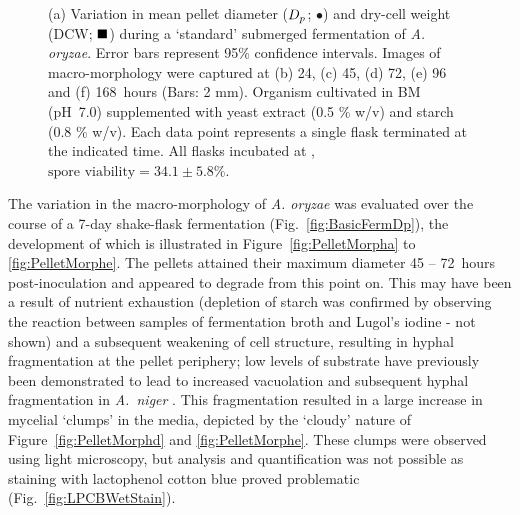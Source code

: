 \begin{figure}[htbp]
	\caption{(a) Variation in mean pellet diameter ($D_p$; $\bullet$) and dry-cell weight (DCW; $\blacksquare$) during a \lq standard' submerged fermentation of \emph{A. oryzae}. Error bars represent 95\% confidence intervals. Images of macro-morphology were captured at (b) 24, (c) 45, (d) 72, (e) 96 and (f) 168~hours (Bars: 2 mm). Organism cultivated in BM (pH~7.0) supplemented with yeast extract (0.5 \% w/v) and starch (0.8 \% w/v). Each data point represents a single flask terminated at the indicated time. All flasks incubated at , $\mbox{spore viability}=34.1 \pm 5.8$\%.}
	\label{fig:BasicFermPellets}
\end{figure}

The variation in the macro-morphology of \emph{A. oryzae} was evaluated over the course of a 7-day shake-flask fermentation (Fig.~\ref{fig:BasicFermDp}), the development of which is illustrated in Figure~\ref{fig:PelletMorpha} to \ref{fig:PelletMorphe}. The pellets attained their maximum diameter 45 -- 72~hours post-inoculation and appeared to degrade from this point on. This may have been a result of nutrient exhaustion (depletion of starch was confirmed by observing the reaction between samples of fermentation broth and Lugol's iodine - not shown) and a subsequent weakening of cell structure, resulting in hyphal fragmentation at the pellet periphery; low levels of substrate have previously been demonstrated to lead to increased vacuolation and subsequent hyphal fragmentation in \emph{A.~niger} \cite{papagianni1999}. This fragmentation resulted in a large increase in mycelial \lq clumps' in the media, depicted by the \lq cloudy' nature of Figure~\ref{fig:PelletMorphd} and \ref{fig:PelletMorphe}. These clumps were observed using light microscopy, but analysis and quantification was not possible as staining with lactophenol cotton blue proved problematic (Fig.~\ref{fig:LPCBWetStain}).

